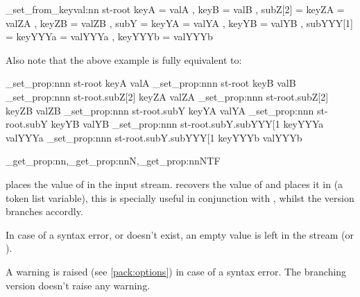 \documentclass[10pt]{article}
\begin{document}
\begin{codestore}[store-env=keyval.demo8]
\starray_set_from_keyval:nn {st-root} 
  {
    keyA = valA ,
    keyB = valB ,
    subZ[2] = 
      {
        keyZA = valZA ,
        keyZB = valZB ,
      }
    subY  =
      {
        keyYA = valYA ,
        keyYB = valYB ,
        subYYY[1] =
          {
            keyYYYa = valYYYa ,
            keyYYYb = valYYYb 
          }
      }
  }  
\end{codestore}


Also note that the above example is fully equivalent to:

\begin{codestore}[store-env=keyval.demo9]
\starray_set_prop:nnn {st-root} {keyA} {valA}
\starray_set_prop:nnn {st-root} {keyB} {valB}
\starray_set_prop:nnn {st-root.subZ[2]} {keyZA} {valZA}
\starray_set_prop:nnn {st-root.subZ[2]} {keyZB} {valZB}
\starray_set_prop:nnn {st-root.subY} {keyYA} {valYA}
\starray_set_prop:nnn {st-root.subY} {keyYB} {valYB}
\starray_set_prop:nnn {st-root.subY.subYYY[1} {keyYYYa} {valYYYa}
\starray_set_prop:nnn {st-root.subY.subYYY[1} {keyYYYb} {valYYYb}
\end{codestore}


\begin{codedescribe}{\starray_get_prop:nn,\starray_get_prop:nnN,\starray_get_prop:nnNTF}
\begin{codesyntax}%
\end{codesyntax}
 places the value of  in the input stream.
 recovers the value of  and places it in  (a token list variable), this is specially useful in conjunction with , whilst the  version branches accordly.
\end{codedescribe}
\begin{tsremark}
In case of a syntax error, or  doesn't exist, an empty value is left in the stream (or ).
\end{tsremark}
\begin{tsremark}
A warning is raised (see \ref{pack:options}) in case of a  syntax error. The branching version doesn't raise any warning.
\end{tsremark}
\end{document}
